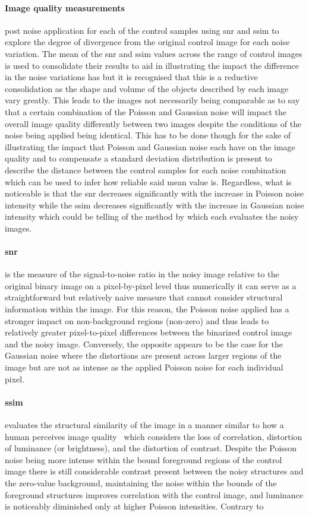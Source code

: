 \paragraph{Image quality measurements} post noise application for each of the control samples using \gls{snr} and \gls{ssim} to explore the degree of divergence from the original control image for each noise variation. The mean of the \gls{snr} and \gls{ssim} values across the range of control images is used to consolidate their results to aid in illustrating the impact the difference in the noise variations has but it is recognised that this is a reductive consolidation as the shape and volume of the objects described by each image vary greatly. This leads to the images not necessarily being comparable as to say that a certain combination of the Poisson and Gaussian noise will impact the overall image quality differently between two images despite the conditions of the noise being applied being identical. This has to be done though for the sake of illustrating the impact that Poisson and Gaussian noise each have on the image quality and to compensate a standard deviation distribution is present to describe the distance between the control samples for each noise combination which can be used to infer how reliable said mean value is. Regardless, what is noticeable is that the \gls{snr} decreases significantly with the increase in Poisson noise intensity while the \gls{ssim} decreases significantly with the increase in Gaussian noise intensity which could be telling of the method by which each evaluates the noisy images. \paragraph{\gls{snr}} is the measure of the signal-to-noise ratio in the noisy image relative to the original binary image on a pixel-by-pixel level thus numerically it can serve as a straightforward but relatively naive measure that cannot consider structural information within the image. For this reason, the Poisson noise applied has a stronger impact on non-background regions (non-zero) and thus leads to relatively greater pixel-to-pixel differences between the binarized control image and the noisy image. Conversely, the opposite appears to be the case for the Gaussian noise where the distortions are present across larger regions of the image but are not as intense as the applied Poisson noise for each individual pixel. \paragraph{\gls{ssim}} evaluates the structural similarity of the image in a manner similar to how a human perceives image quality~\cite{snrVSssim} which considers the loss of correlation, distortion of luminance (or brightness), and the distortion of contrast. Despite the Poisson noise being more intense within the bound foreground regions of the control image there is still considerable contrast present between the noisy structures and the zero-value background, maintaining the noise within the bounds of the foreground structures improves correlation with the control image, and luminance is noticeably diminished only at higher Poisson intensities. Contrary to 